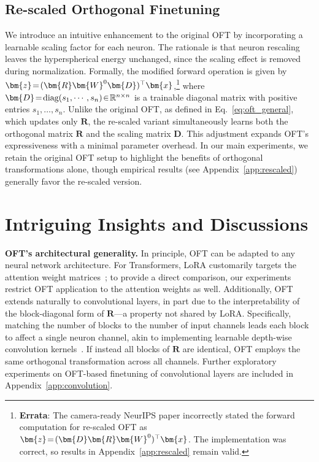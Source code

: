 \subsection{Re-scaled Orthogonal Finetuning}

We introduce an intuitive enhancement to the original OFT by incorporating a learnable scaling factor for each neuron. The rationale is that neuron rescaling leaves the hyperspherical energy unchanged, since the scaling effect is removed during normalization. Formally, the modified forward operation is given by $\thickmuskip=2mu \medmuskip=2mu\bm{z}=(\bm{R}\bm{W}^0\bm{D})^\top\bm{x}$,\footnote{\textbf{Errata}: The camera-ready NeurIPS paper incorrectly stated the forward computation for re-scaled OFT as $\thickmuskip=2mu \medmuskip=2mu\bm{z}=(\bm{D}\bm{R}\bm{W}^0)^\top\bm{x}$. The implementation was correct, so results in Appendix~\ref{app:rescaled} remain valid.} where $\thickmuskip=2mu \medmuskip=2mu \bm{D}=\text{diag}(s_1,\cdots,s_n)\in\mathbb{R}^{n\times n}$ is a trainable diagonal matrix with positive entries $s_1,\ldots,s_n$. Unlike the original OFT, as defined in Eq.~\eqref{eq:oft_general}, which updates only $\bm{R}$, the re-scaled variant simultaneously learns both the orthogonal matrix $\bm{R}$ and the scaling matrix $\bm{D}$. This adjustment expands OFT’s expressiveness with a minimal parameter overhead. In our main experiments, we retain the original OFT setup to highlight the benefits of orthogonal transformations alone, though empirical results (see Appendix~\ref{app:rescaled}) generally favor the re-scaled version.

\section{Intriguing Insights and Discussions}

\textbf{OFT’s architectural generality.} In principle, OFT can be adapted to any neural network architecture. For Transformers, LoRA customarily targets the attention weight matrices~\cite{hulora2022}; to provide a direct comparison, our experiments restrict OFT application to the attention weights as well. Additionally, OFT extends naturally to convolutional layers, in part due to the interpretability of the block-diagonal form of $\bm{R}$—a property not shared by LoRA. Specifically, matching the number of blocks to the number of input channels leads each block to affect a single neuron channel, akin to implementing learnable depth-wise convolution kernels~\cite{chollet2017xception}. If instead all blocks of $\bm{R}$ are identical, OFT employs the same orthogonal transformation across all channels. Further exploratory experiments on OFT-based finetuning of convolutional layers are included in Appendix~\ref{app:convolution}.

